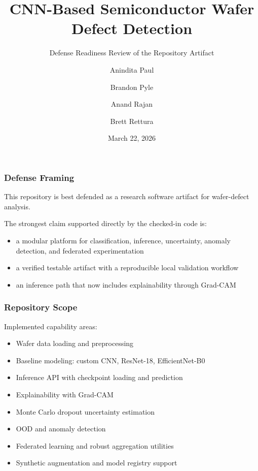 \documentclass{beamer}
\title{CNN-Based Semiconductor Wafer Defect Detection}
\subtitle{Defense Readiness Review of the Repository Artifact}
\author{Anindita Paul \and Brandon Pyle \and Anand Rajan \and Brett Rettura}
\institute{Verified Software Artifact Summary}
\date{March 22, 2026}
\begin{document}
\frame{\titlepage}

\begin{frame}
  \frametitle{Defense Framing}
  This repository is best defended as a research software artifact for wafer-defect analysis.

  \vspace{0.4cm}
  The strongest claim supported directly by the checked-in code is:

  \begin{itemize}
    \item a modular platform for classification, inference, uncertainty, anomaly detection, and federated experimentation
    \item a verified testable artifact with a reproducible local validation workflow
    \item an inference path that now includes explainability through Grad-CAM
  \end{itemize}
\end{frame}

\begin{frame}
  \frametitle{Repository Scope}
  Implemented capability areas:

  \begin{itemize}
    \item Wafer data loading and preprocessing
    \item Baseline modeling: custom CNN, ResNet-18, EfficientNet-B0
    \item Inference API with checkpoint loading and prediction
    \item Explainability with Grad-CAM
    \item Monte Carlo dropout uncertainty estimation
    \item OOD and anomaly detection
    \item Federated learning and robust aggregation utilities
    \item Synthetic augmentation and model registry support
  \end{itemize}
\end{frame}
\end{document}
